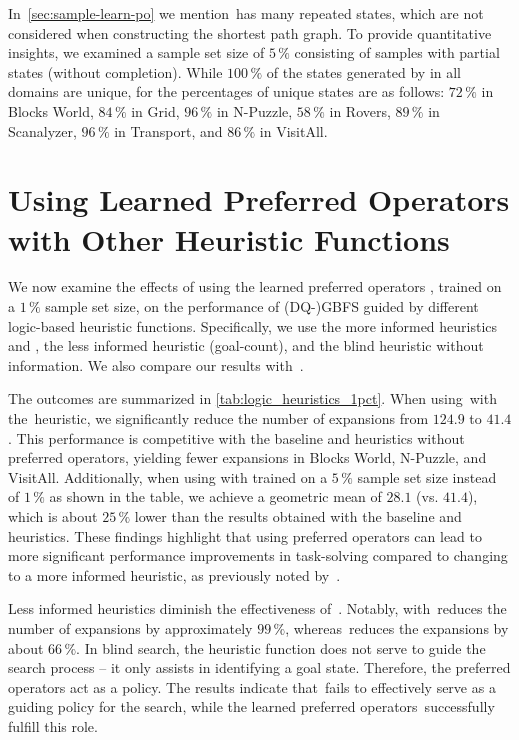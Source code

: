 \documentclass[ppgc,diss,english]{iiufrgs}
\begin{document}
In~\cref{sec:sample-learn-po} we mention~\bfsrw has many repeated states, which are not considered when constructing the shortest path graph. To provide quantitative insights, we examined a sample set size of $5\,\%$ consisting of samples with partial states (without completion). While $100\,\%$ of the states generated by \bfsrs in all domains are unique, for \bfsrw the percentages of unique states are as follows: $72\,\%$ in Blocks World, $84\,\%$ in Grid, $96\,\%$ in N-Puzzle, $58\,\%$ in Rovers, $89\,\%$ in Scanalyzer, $96\,\%$ in Transport, and $86\,\%$ in VisitAll.




\section{Using Learned Preferred Operators with Other Heuristic Functions}
\label{sec:other-heuristic-functions}
We now examine the effects of using the learned preferred operators \pog, trained on a $1\,\%$ sample set size, on the performance of (DQ-)GBFS guided by different logic-based heuristic functions. Specifically, we use the more informed heuristics \hff and \hadd, the less informed heuristic \hgc (goal-count), and the blind heuristic \hblind without information. We also compare our results with~\poff.

The outcomes are summarized in \cref{tab:logic_heuristics_1pct}. When using~\pog with the~\hgc heuristic, we significantly reduce the number of expansions from $124.9$ to $41.4$. This performance is competitive with the baseline \hff and \hadd heuristics without preferred operators, yielding fewer expansions in Blocks World, N-Puzzle, and VisitAll. Additionally, when using \hgc with \pog trained on a $5\,\%$ sample set size instead of $1\,\%$ as shown in the table, we achieve a geometric mean of $28.1$ (vs. $41.4$), which is about $25\,\%$ lower than the results obtained with the baseline \hff and \hadd heuristics. These findings highlight that using preferred operators can lead to more significant performance improvements in task-solving compared to changing to a more informed heuristic, as previously noted by~\citet{Correa.etal/2022}.



Less informed heuristics diminish the effectiveness of~\poff. Notably, \hblind with~\pog reduces the number of expansions by approximately $99\,\%$, whereas~\poff reduces the expansions by about $66\,\%$. In blind search, the heuristic function does not serve to guide the search process -- it only assists in identifying a goal state. Therefore, the preferred operators act as a policy. The results indicate that~\poff fails to effectively serve as a guiding policy for the search, while the learned preferred operators~\pog successfully fulfill this role.
\end{document}
